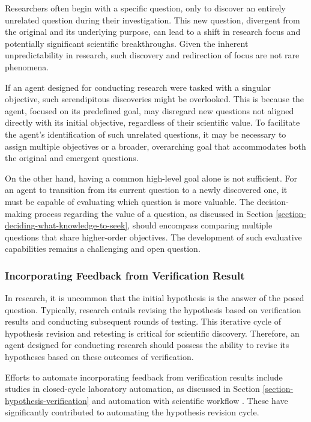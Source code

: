 \documentclass{article}
\begin{document}
Researchers often begin with a specific question, only to discover an entirely unrelated question during their investigation. This new question, divergent from the original and its underlying purpose, can lead to a shift in research focus and potentially significant scientific breakthroughs. Given the inherent unpredictability in research, such discovery and redirection of focus are not rare phenomena.

If an agent designed for conducting research were tasked with a singular objective, such serendipitous discoveries might be overlooked. This is because the agent, focused on its predefined goal, may disregard new questions not aligned directly with its initial objective, regardless of their scientific value. To facilitate the agent's identification of such unrelated questions, it may be necessary to assign multiple objectives or a broader, overarching goal that accommodates both the original and emergent questions.

On the other hand, having a common high-level goal alone is not sufficient. For an agent to transition from its current question to a newly discovered one, it must be capable of evaluating which question is more valuable. The decision-making process regarding the value of a question, as discussed in Section \ref{section-deciding-what-knowledge-to-seek}, should encompass comparing multiple questions that share higher-order objectives. The development of such evaluative capabilities remains a challenging and open question.

\subsubsection{Incorporating Feedback from Verification Result}

In research, it is uncommon that the initial hypothesis is the answer of the posed question. Typically, research entails revising the hypothesis based on verification results and conducting subsequent rounds of testing. This iterative cycle of hypothesis revision and retesting is critical for scientific discovery. Therefore, an agent designed for conducting research should possess the ability to revise its hypotheses based on these outcomes of verification.

Efforts to automate incorporating feedback from verification results include studies in closed-cycle laboratory automation, as discussed in Section \ref{section-hypothesis-verification} and automation with scientific workflow \cite{gil2022will}. These have significantly contributed to automating the hypothesis revision cycle.
\end{document}
